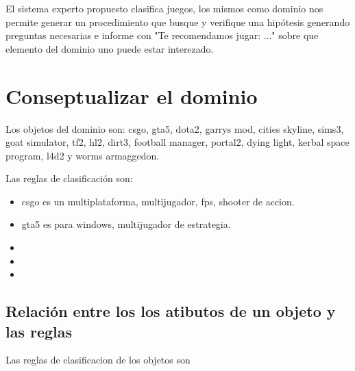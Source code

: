 \documentclass[11pt,oneside,a4paper]{article}
\begin{document}
El sistema experto propuesto clasifica juegos, los mismos como 
dominio nos permite generar un procedimiento que busque y verifique
una hipótesis generando preguntas necesarias e informe con
"Te recomendamos jugar: ..." sobre que elemento del dominio uno 
puede estar interezado.


\section{Conseptualizar el dominio}

Los objetos del dominio son:
csgo, 
gta5, 
dota2, 
garrys mod, 
cities skyline, 
sims3, 
goat simulator, 
tf2, 
hl2, 
dirt3, 
football manager, 
portal2, 
dying light, 
kerbal space program, 
l4d2 y 
worms armaggedon.

Las reglas de clasificación son:

\begin{itemize}
  \item csgo es un multiplataforma, multijugador, fps, shooter de accion. 
  \item gta5 es para windows, multijugador de estrategia.
  \item 
  \item 
  \item 
\end{itemize}

\subsection{Relación entre los los atibutos de un objeto y las reglas}


Las reglas de clasificacion de los objetos son


\inputminted[firstline=1, lastline=13, fontsize=\footnotesize]{perl}{tp-prolog.pl}
\end{document}
